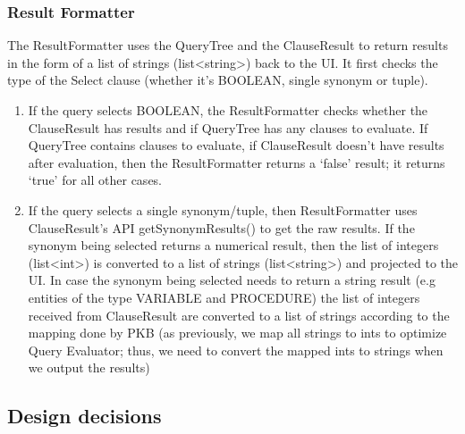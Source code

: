 \documentclass[12pt]{article}
\begin{document}
{{{{{{{{{{\subsubsection{Result Formatter}
The ResultFormatter uses the QueryTree and the ClauseResult to return results in the form of a list of strings (list<string>)  back to the UI. It first checks the type of the Select clause (whether it’s BOOLEAN, single synonym or tuple). 
\begin{enumerate}
\item If the query selects BOOLEAN, the ResultFormatter checks whether the ClauseResult has results and if QueryTree has any clauses to evaluate. If QueryTree contains clauses to evaluate, if ClauseResult doesn’t have results after evaluation, then the ResultFormatter returns a ‘false’ result; it returns ‘true’ for all other cases.
\item If the query selects a single synonym/tuple, then ResultFormatter uses ClauseResult’s API getSynonymResults() to get the raw results. If the synonym being selected returns a numerical result, then the list of integers (list<int>) is converted to a list of strings (list<string>) and projected to the UI. In case the synonym being selected needs to return a string result (e.g entities of the type VARIABLE and PROCEDURE) the list of integers received from ClauseResult are converted to a list of strings according to the mapping done by PKB (as previously, we map all strings to ints to optimize Query Evaluator; thus, we need to convert the mapped ints to strings when we output the results)
\end{enumerate}
\subsection{Design decisions}
}}}}}}}}}}
\end{document}
